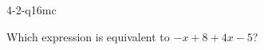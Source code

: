 \documentclass[12pt, fleqn, openany]{studyGuide}
\begin{document}
\begin{practiceQuestion}{4-2-q16}{mc}
\begin{questionText}
Which expression is equivalent to $-x + 8 + 4x - 5$?
\end{questionText}
\end{practiceQuestion}



\printAnswerKey


\end{document}
